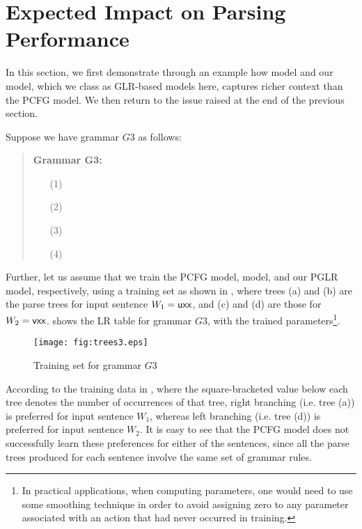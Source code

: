 \documentclass[a4j]{article}
\def\BC{}
\def\fig#1{}
\def\tbl#1{}
\begin{document}
\section{Expected Impact on Parsing Performance}
\label{sec:example}

In this section, we first demonstrate through an example how \BC model
and our model, which we class as GLR-based models here, captures richer
context than the PCFG model. We then return to the issue raised at the
end of the previous section.

Suppose we have grammar $G3$ as follows:
\begin{quote}
{\bf Grammar G3:}
  \begin{itemize}\itemsep=0mm
  \item[(1)]
  \item[(2)]
  \item[(3)]
  \item[(4)]
  \end{itemize}
\end{quote}
Further, let us assume that we train the PCFG model, \BC model, and our
PGLR model, respectively, using a training set as shown in \fig{trees3},
where trees (a) and (b) are the parse trees for input sentence
$W_1=\mbox{\sf uxx}$, and (c) and (d) are those for $W_2=\mbox{\sf
vxx}$.
\tbl{LR-table3} shows the LR table for grammar $G3$, with the trained
parameters\footnote{In practical applications, when computing
parameters, one would need to use some smoothing technique in order to
avoid assigning zero to any parameter associated with an action that had
never occurred in training.}.

\begin{figure}[t]
  \begin{center}
    \leavevmode
    \texttt{[image: fig:trees3.eps]}
    \caption{Training set for grammar $G3$}
    \label{fig:trees3}
  \end{center}
\end{figure}

According to the training data in \fig{trees3}, where the
square-bracketed value below each tree denotes the number of occurrences
of that tree, right branching (i.e. tree (a)) is preferred for input
sentence $W_1$, whereas left branching (i.e. tree (d)) is preferred for
input sentence $W_2$.
It is easy to see that the PCFG model does not successfully learn these
preferences for either of the sentences, since all the parse trees
produced for each sentence involve the same set of grammar rules.
\end{document}
